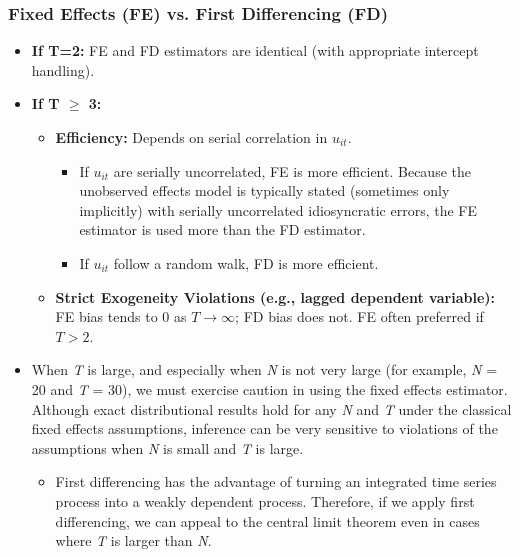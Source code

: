 \documentclass[a4paper, 10pt]{article}
\theoremstyle{definition}	%
\begin{document}
\subsubsection{Fixed Effects (FE) vs. First Differencing (FD)}
\begin{itemize}
    \item \textbf{If T=2:} FE and FD estimators are identical (with appropriate intercept handling).
    \item \textbf{If T \(\ge\) 3:}
    \begin{itemize}
        \item \textbf{Efficiency:} Depends on serial correlation in \(u_{it}\).
        \begin{itemize}
            \item If \(u_{it}\) are serially uncorrelated, FE is more efficient. Because the unobserved effects model is typically stated (sometimes only implicitly) with serially uncorrelated idiosyncratic errors, the FE estimator is used more than the FD estimator. 
            \item If \(u_{it}\) follow a random walk, FD is more efficient.
        \end{itemize}
        \item \textbf{Strict Exogeneity Violations (e.g., lagged dependent variable):} FE bias tends to \(0\) as \(T \to \infty\); FD bias does not. FE often preferred if \(T > 2\).
    \end{itemize}
    \item When \textit{T} is large, and especially when \textit{N} is not very large (for example, \textit{N} = 20 and \textit{T} = 30), we must exercise caution in using the fixed effects estimator. Although exact distributional results hold for any \textit{N} and \textit{T} under the classical fixed effects assumptions, inference can be very sensitive to violations of the assumptions when \textit{N} is small and \textit{T} is large.
    \begin{itemize}
        \item First differencing has the advantage of turning an integrated time series process into a weakly dependent process. Therefore, if we apply first differencing, we can appeal to the central limit theorem even in cases where \textit{T} is larger than \textit{N}.
    \end{itemize}
\end{itemize}
\end{document}
